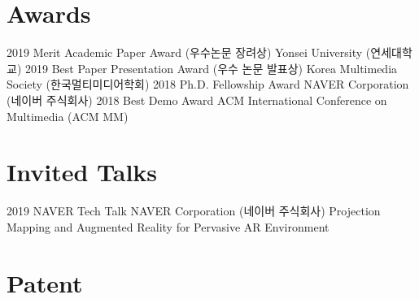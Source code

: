 \documentclass[]{friggeri-cv}
\begin{document}
\begin{refsection}
  \nocite{*}
  \printbibliography[
    type=inproceedings, 
    title=\textbf{Conference proceedings}, 
    heading=subbibliography,
    keyword={selected}
  ]
\end{refsection}

\par\null%
\section{Awards}

\begin{entrylist}
\entry
    {2019}
    {Merit Academic Paper Award (우수논문 장려상)}
    {}
    {Yonsei University (연세대학교)}
\entry
    {2019}
    {Best Paper Presentation Award (우수 논문 발표상)}
    {}
    {Korea Multimedia Society (한국멀티미디어학회)}
\entry
    {2018}
    {Ph.D. Fellowship Award}
    {}
    {NAVER Corporation (네이버 주식회사)}
\entry
    {2018}
    {Best Demo Award}
    {}
    {ACM International Conference on Multimedia (ACM MM)}
\end{entrylist}

\section{Invited Talks}

\begin{entrylist}
\entry
    {2019}
    {NAVER Tech Talk}
    {NAVER Corporation (네이버 주식회사)}
    {Projection Mapping and Augmented Reality for Pervasive AR Environment}
\end{entrylist}

\section{Patent}

\begin{refsection}
  \nocite{*}
  \printbibliography[
    type=misc, 
    title=\textbf{Domestic (Republic of Korea)}, 
    heading=subbibliography,
    keyword={patent}
  ]
\end{refsection}
\end{document}
